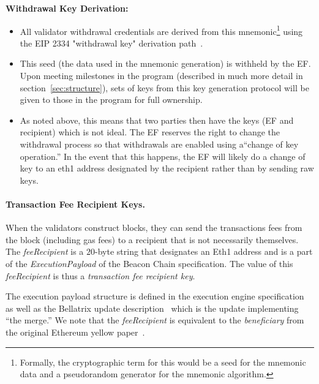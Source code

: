 \textbf{Withdrawal Key Derivation:}
\begin{itemize}
\item All validator withdrawal credentials are derived from this mnemonic\footnote{Formally, the cryptographic term for this would be a seed for the mnemonic data and a pseudorandom generator for the mnemonic algorithm.} using the EIP 2334 "withdrawal key" derivation path~\cite{EthBLSHierarchy}.
\item This seed (the data used in the mnemonic generation) is withheld by the EF. Upon meeting milestones in the program (described in much more detail in section~\ref{sec:structure}), sets of keys from this key generation protocol will be given to those in the program for full ownership.
\item  As noted above, this means that two parties then have the keys (EF and recipient) which is not ideal.  The EF reserves the right to change the withdrawal process so that withdrawals are enabled using a``change of key operation.'' In the event that this happens, the EF will likely do a change of key to an eth1 address designated by the recipient rather than by sending raw keys. 
\end{itemize}

\paragraph{Transaction Fee Recipient Keys.}    When the validators construct blocks, they can send the transactions fees from the block (including gas fees) to a recipient that is not necessarily themselves.  The \emph{feeRecipient} is a $20$-byte string that designates an Eth1 address and is a part of the \emph{ExecutionPayload} of the Beacon Chain specification.  The value of this \emph{feeRecipient} is thus a \emph{transaction fee recipient key}.  

The execution payload structure is defined in the execution engine specification~\cite{EthEng} as well as the Bellatrix update description~\cite{EthBella} which is the update implementing ``the merge.''  We note that the \emph{feeRecipient} is equivalent to the \emph{beneficiary} from the original Ethereum yellow paper~\cite{wood2014ethereum}.